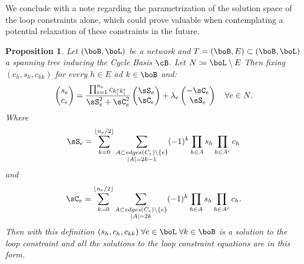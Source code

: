 \documentclass[11pt,a4paper,oneside,openany]{book}
\newtheorem{prop}[theorem]{Proposition}
\numberwithin{definition}{section}
\numberwithin{theorem}{section}
\numberwithin{problem}{section}
\begin{document}
We conclude with a note regarding the parametrization of the solution space of the loop constraints alone, which could prove valuable when contemplating a potential relaxation of these constraints in the future.

\begin{prop} \label{loop solution space parametrization}
    Let $(\boB,\boL)$ be a network and $T = (\boB,E) \subset (\boB,\boL)$ a spanning tree inducing the Cycle Basis $\cB$. Let $N \coloneqq \boL \setminus E$
    Then fixing $(c_h,s_h,c_{kk})$ for every $h \in E$ ad $k \in \boB$ and:
    \begin{equation}
    \begin{pmatrix}
        s_e \\ c_e
    \end{pmatrix} 
    = \frac{\prod_{i=1}^{n_e}c_{k^e_ik^e_i}}{\sS_e^2 + \sC_e^2}
    \begin{pmatrix}
        \sS_e \\ \sC_e
    \end{pmatrix}
    + \lambda_e 
    \begin{pmatrix}
        - \sC_e \\ \sS_e
    \end{pmatrix}
    \quad \forall e \in N.
\end{equation}
Where 
\begin{equation}
    \sS_e =  \sum_{k = 0}^{\lfloor n_e/2 \rfloor}\sum_{\substack{A \subset edges(C_e) \setminus \{e\}\\|A|=2k-1}} (-1)^k \prod_{h \in A}s_{h}\prod_{h \in A^c}c_{h}
\end{equation}
and
\begin{equation}
     \sC_e =\sum_{k = 0}^{\lfloor n_e/2 \rfloor}\sum_{\substack{A \subset edges(C_e)\setminus \{e\}\\|A|=2k}}(-1)^k\prod_{h \in A}s_{h}\prod_{h \in A^c}c_{h}.
\end{equation}
Then with this definition $(s_h,c_h,c_{kk})\; \forall e \in \boL\; \forall k \in \boB$ is a solution to the loop constraint and all the solutions to the loop constraint equations are in this form. 
\end{prop}
\end{document}
